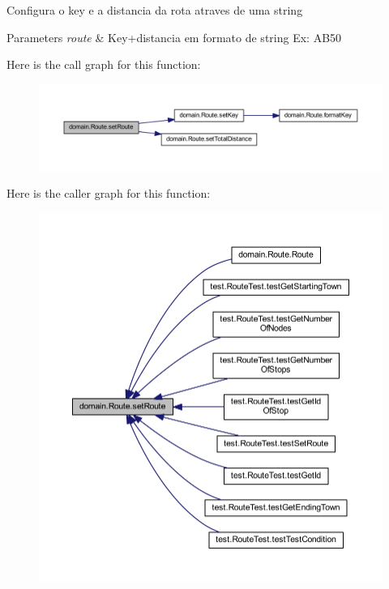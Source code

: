 Configura o key e a distancia da rota atraves de uma string


\begin{DoxyParams}{Parameters}
{\em route} & Key+distancia em formato de string Ex\+: A\+B50 \\
\hline
\end{DoxyParams}
Here is the call graph for this function\+:\nopagebreak
\begin{figure}[H]
\begin{center}
\leavevmode
\includegraphics[width=350pt]{classdomain_1_1_route_ac152ebbec9a46aee30cdd98c3a35a6d5_cgraph}
\end{center}
\end{figure}
Here is the caller graph for this function\+:\nopagebreak
\begin{figure}[H]
\begin{center}
\leavevmode
\includegraphics[width=350pt]{classdomain_1_1_route_ac152ebbec9a46aee30cdd98c3a35a6d5_icgraph}
\end{center}
\end{figure}
\mbox{\label{classdomain_1_1_route_a33d5c5c64f0fdb4a0317ec0019bedc5a}} 
